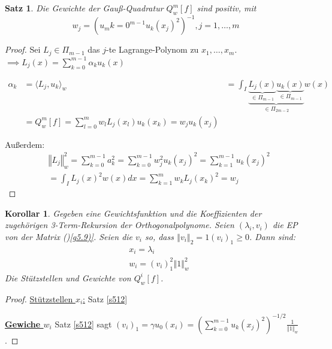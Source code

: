 \documentclass{book}
\newtheorem{theorem}[algorithm]{Satz}
\newtheorem{corollary}[algorithm]{Korollar}
\begin{document}
            \begin{theorem}\label{s513}
                Die Gewichte der Gauß-Quadratur $Q_w^m[f]$ sind positiv, mit 
                \begin{equation*}
                    w_j=\left(u_m{k=0}^{m-1}u_k(x_j)^2\right)^{-1}, j=1,\dots, m
                \end{equation*}
            \end{theorem}
            \begin{proof}
                Sei $L_j\in\Pi_{m-1}$ das $j$-te Lagrange-Polynom zu $x_1,\dots,x_m$.
                $\implies L_j(x)=\sum_{k=0}^{m-1} \alpha_k u_k(x)$
            
                \begin{align*}
                    \alpha_k&=\langle L_j,u_k \rangle_w
                &=\int_I \underbrace{\underbrace{L_j(x)}_{\in \Pi_{m-1}}\underbrace{u_k(x)}_{\in \Pi_{m-1}}}_{\in \Pi_{2m-2}}w(x)\\
                &=Q_w^m[f]=\sum_{l=0}^m w_l L_j(x_l) u_k(x_k)=w_j u_k(x_j)
                \end{align*}

                Außerdem: 
                \begin{align*}
                    &\left\Vert L_j \right\Vert_w^2 = \sum_{k=0}^{m-1} a_k^2 = \sum_{k=0}^{m-1} w_j^2u_k(x_j)^2=\sum_{k=1}^{m-1}u_k(x_j)^2\\
                    &=\int_I{L_j}(x)^2w(x)dx=\sum_{k=1}^mw_kL_j(x_k)^2 = w_j
                \end{align*}

            \end{proof}

            \begin{corollary}\label{k514}
                Gegeben eine Gewichtsfunktion und die Koeffizienten der zugehörigen 3-Term-Rekursion der Orthogonalpolynome. Seien $(\lambda_i,v_i)$ die EP von der Matrix 
                ()\ref{g5.9)}. Seien die $v_i$ so, dass $\left\Vert v_i \right\Vert_2=1(v_i)_1\geq 0$. Dann sind:
                \begin{align*}
                    &x_i=\lambda_i\\
                    &w_i=(v_i)^2_1 \left\Vert 1 \right\Vert_w^2
                \end{align*}
                Die Stützstellen und Gewichte von $Q_w^i[f]$.
            \end{corollary}

            \begin{proof}
                \underline{\textbf{}Stützstellen $x_i$:} Satz \ref{s512}

                \underline{\textbf{Gewiche $w_i$}} Satz \ref{s512} sagt $(v_i)_1=\gamma u_0(x_i)=\left(\sum_{k=0}^{m-1}u_k(x_j)^2\right)^{-1/2}\frac{1}{\left\Vert 1 \right\Vert_w}$.

            \end{proof}
\end{document}
